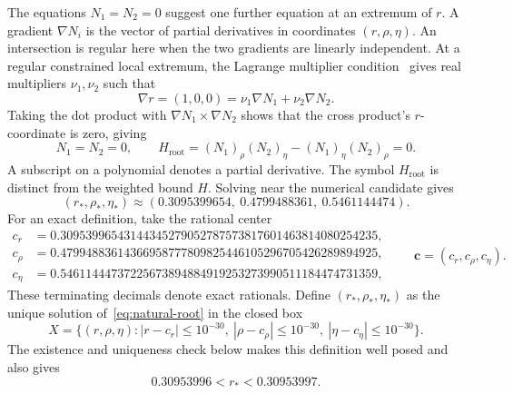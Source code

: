 \documentclass[11pt]{article}
\theoremstyle{remark}
\theoremstyle{plain}
\begin{document}
The equations $N_1=N_2=0$ suggest one further equation at an extremum
of $r$. A gradient $\nabla N_i$ is the vector of partial derivatives
in coordinates $(r,\rho,\eta)$. An intersection is regular here when
the two gradients are linearly independent. At a regular constrained
local extremum, the Lagrange multiplier
condition~\cite{nocedal2006} gives real multipliers
$\nu_1,\nu_2$ such that
\[
 \nabla r=(1,0,0)=\nu_1\nabla N_1+\nu_2\nabla N_2.
\]
Taking the dot product with
$\nabla N_1\times\nabla N_2$ shows that the cross product's
$r$-coordinate is zero, giving
\begin{equation}
 N_1=N_2=0,\qquad
 H_{\mathrm{root}}=(N_1)_\rho(N_2)_\eta-(N_1)_\eta(N_2)_\rho=0.
 \label{eq:natural-root}
\end{equation}
A subscript on a polynomial denotes a partial derivative.
The symbol $H_{\mathrm{root}}$ is distinct from the weighted bound $H$.
Solving near the numerical candidate gives
\[
 (r_*,\rho_*,\eta_*)\approx
 (0.3095399654,\ 0.4799488361,\ 0.5461144474).
\]
For an exact definition, take the rational center
\begin{equation}
 \begin{aligned}
 c_r&=0.30953996543144345279052787573817601463814080254235,\\
 c_\rho&=0.47994883614366958777809825446105296705426289894925,\\
 c_\eta&=0.54611444737225673894884919253273990511184474731359,
 \end{aligned}
 \qquad \boldsymbol c=(c_r,c_\rho,c_\eta).
 \label{eq:app-root-center}
\end{equation}
These terminating decimals denote exact rationals. Define
$(r_*,\rho_*,\eta_*)$ as the unique solution
of~\eqref{eq:natural-root} in the closed box
\begin{equation}
 X=\{(r,\rho,\eta):
 |r-c_r|\le10^{-30},\
 |\rho-c_\rho|\le10^{-30},\
 |\eta-c_\eta|\le10^{-30}\}.
 \label{eq:app-root-box}
\end{equation}
The existence and uniqueness check below makes this definition
well posed and also gives
\begin{equation}
 0.30953996<r_*<0.30953997.
 \label{eq:app-root-value}
\end{equation}
\end{document}
